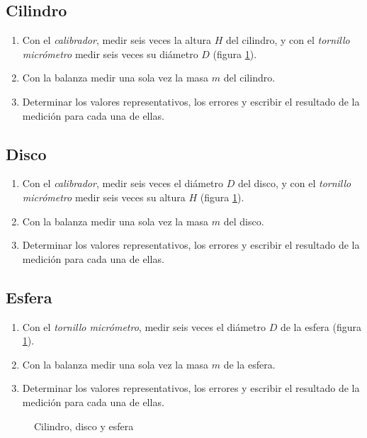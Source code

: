 \documentclass[letter,11pt]{article}
\begin{document}
\subsection{Cilindro}
\begin{enumerate}
\item Con el \emph{calibrador}, medir seis veces la altura $H$ del cilindro, y
con el \emph{tornillo micrómetro} medir seis veces su diámetro $D$ (figura
\ref{objetos}).
\item Con la balanza medir una sola vez la masa $m$ del cilindro.
\item Determinar los valores representativos, los errores y escribir el
resultado de la medición para cada una de ellas.
\end{enumerate}

\subsection{Disco}
\begin{enumerate}
\item Con el \emph{calibrador}, medir seis veces el diámetro $D$ del disco, y
con el \emph{tornillo micrómetro} medir seis veces su altura $H$ (figura
\ref{objetos}).
\item Con la balanza medir una sola vez la masa $m$ del disco.
\item Determinar los valores representativos, los errores y escribir el
resultado de la medición para cada una de ellas.
\end{enumerate}

\subsection{Esfera}
\begin{enumerate}
\item Con el \emph{tornillo micrómetro}, medir seis veces el diámetro $D$ de
la esfera (figura \ref{objetos}).
\item Con la balanza medir una sola vez la masa $m$ de la esfera.
\item Determinar los valores representativos, los errores y escribir el
resultado de la medición para cada una de ellas.
\end{enumerate}

\begin{figure}
\centering

\caption{Cilindro, disco y esfera}
\label{objetos}
\end{figure}
\end{document}
